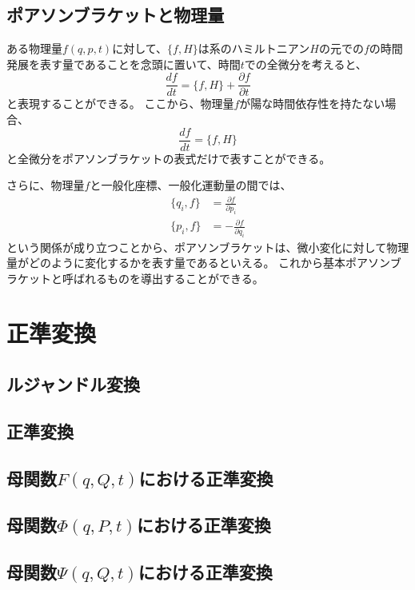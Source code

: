 \documentclass[a4paper]{jsreport}
\begin{document}
        \section{ポアソンブラケットと物理量}
            ある物理量$f(q, p ,t)$に対して、$\{ {f, H} \}$は系のハミルトニアン$H$の元での$f$の時間発展を表す量であることを念頭に置いて、時間$t$での全微分を考えると、
            \begin{equation}
                \frac{df}{dt} = \{f, H\} + \frac{\partial f}{\partial t}
            \end{equation}
            と表現することができる。
            ここから、物理量$f$が陽な時間依存性を持たない場合、
            \begin{equation}
                \frac{df}{dt} = \{f, H\}
            \end{equation}
            と全微分をポアソンブラケットの表式だけで表すことができる。\par
            さらに、物理量$f$と一般化座標、一般化運動量の間では、
            \begin{align}
                \{ q_i, f \} &= \frac{\partial f}{\partial p_i} \\
                \{ p_i, f \} &= - \frac{\partial f}{\partial q_i}
            \end{align}
            という関係が成り立つことから、ポアソンブラケットは、微小変化に対して物理量がどのように変化するかを表す量であるといえる。
            これから基本ポアソンブラケットと呼ばれるものを導出することができる。


    \chapter{正準変換}
        \section{ルジャンドル変換}
        \section{正準変換}
        \section{母関数$F(q, Q, t)$における正準変換}
        \section{母関数$\Phi(q, P, t)$における正準変換}
        \section{母関数$\Psi(q, Q, t)$における正準変換}
\end{document}
